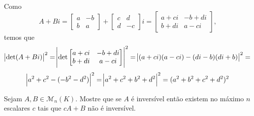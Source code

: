 \documentclass[11pt,a4paper]{article}
\begin{document}
{Como 
\[
A + Bi =  \begin{bmatrix} a & -b \\ b & a \end{bmatrix} + \begin{bmatrix} c & d \\ d & -c \end{bmatrix}i =  \begin{bmatrix} a + ci & -b + di \\ b+di & a - ci \end{bmatrix},
\]
temos que
\[
\abs{\det(A + Bi)}^2 = \abs{\det \begin{bmatrix} a + ci & -b + di \\ b+di & a - ci \end{bmatrix}}^2 = \abs{(a+ci)(a-ci) - (di - b)(di+b)}^2  = \]\[\abs{a^2 + c^2 - (- b^2 - d^2)}^2 = \abs{a^2 + c^2 + b^2 + d^2}^2 = (a^2 + b^2 + c^2 + d^2)^2
\]
}


 Sejam $A, B \in \mathcal{M}_n(K).$ Mostre que se $A$ é inversível então existem no máximo $n$ escalares $c$
tais que $cA + B$ não é inversível. 
\end{document}
